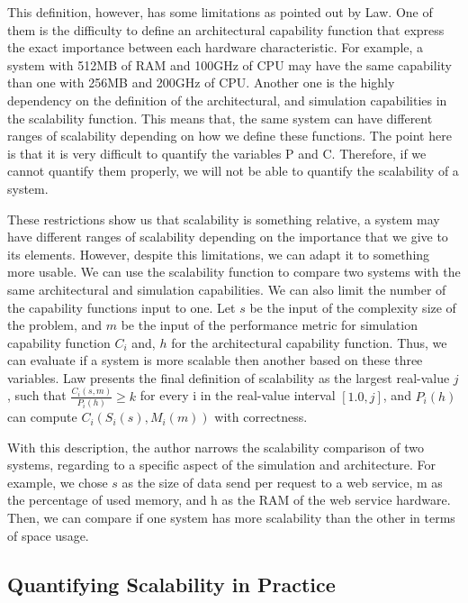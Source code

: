 This definition, however, has some limitations as pointed out by Law. One of them is the difficulty to define an architectural capability function that express the exact importance between each hardware characteristic. For example, a system with 512MB of RAM and 100GHz of CPU may have the same capability than one with 256MB and 200GHz of CPU. Another one is the highly dependency on the definition of the architectural, and simulation capabilities in the scalability function. This means that, the same system can have different ranges of scalability depending on how we define these functions. The point here is that it is very difficult to quantify the variables P and C. Therefore, if we cannot quantify them properly, we will not be able to quantify the scalability of a system. 

These restrictions show us that scalability is something relative, a system may have different ranges of scalability depending on the importance that we give to its elements. However, despite this limitations, we can adapt it to something more usable. We can use the scalability function to compare two systems with the same architectural and simulation capabilities. We can also limit the number of the capability functions input to one. Let $s$ be the input of the complexity size of the problem, and $m$ be the input of the performance metric for simulation capability function $C_{i}$ and, $h$ for the architectural capability function. Thus, we can evaluate if a system is more scalable then another based on these three variables. Law presents the final definition of scalability as the largest real-value $j$, such that $\frac{C_{i}(s, m)}{P_{i}(h)} \geq k$ for every i in the real-value interval $[1.0, j]$, and $P_{i}(h)$ can compute $C_{i}(S_{i}(s), M_{i}(m))$ with correctness.

With this description, the author narrows the scalability comparison of two systems, regarding to a specific aspect of the simulation and architecture. For example, we chose $s$ as the size of data send per request to a web service, m as the percentage of used memory, and h as the RAM of the web service hardware. Then, we can compare if one system has more scalability than the other in terms of space usage.

\subsection{Quantifying Scalability in Practice}

